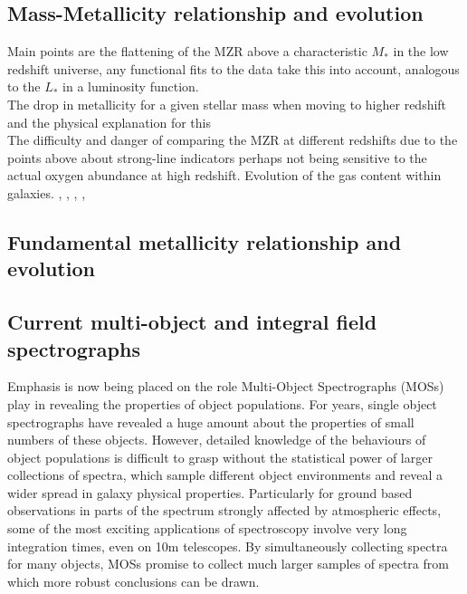 \documentclass{literature}
\begin{document}
\subsection{Mass-Metallicity relationship and evolution}

Main points are the flattening of the MZR above a characteristic $M_{*}$ in the low redshift universe, any functional fits to the data take this into account, analogous to the $L_{*}$ in a luminosity function. \\ 
The drop in metallicity for a given stellar mass when moving to higher redshift and the physical explanation for this \\ 
The difficulty and danger of comparing the MZR at different redshifts due to the points above about strong-line indicators perhaps not being sensitive to the actual oxygen abundance at high redshift. Evolution of the gas content within galaxies. 
\citep{Savaglio2005}, \citep{Maiolino2008}, \citep{Erb_2006}, \citep{Tremonti2004}, \citep{Kewley2013}

\begin{figure}[!htp]
\centering
{}
\caption{\footnotesize{\emph{}}}
\label{fig:steidel_mzr}
\end{figure}





\subsection{Fundamental metallicity relationship and evolution}

\subsection{Current multi-object and integral field spectrographs}\label{subsec:current_int}

Emphasis is now being placed on the role Multi-Object Spectrographs (MOSs) play in revealing the properties of object populations. For years, single object spectrographs have revealed a huge amount about the properties of small numbers of these objects. However, detailed knowledge of the behaviours of object populations is difficult to grasp without the statistical power of larger collections of spectra, which sample different object environments and reveal a wider spread in galaxy physical properties. Particularly for ground based observations in parts of the spectrum strongly affected by atmospheric effects, some of the most exciting applications of spectroscopy involve very long integration times, even on 10m telescopes. By simultaneously collecting spectra for many objects, MOSs promise to collect much larger samples of spectra from which more robust conclusions can be drawn. \\
\end{document}
